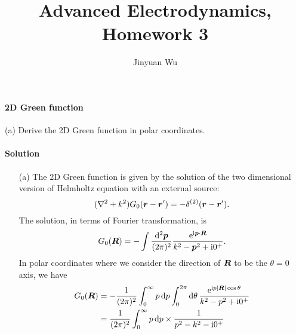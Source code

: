 \documentclass[hyperref, a4paper]{article}
\title{Advanced Electrodynamics, Homework 3}
\author{Jinyuan Wu}
\newcommand*{\ii}{\mathrm{i}}
\newcommand*{\ee}{\mathrm{e}}
\begin{document}
\maketitle

\paragraph{2D Green function} (a) Derive the 2D Green function in polar coordinates.

\paragraph{Solution} \begin{itemize}
\item[(a)] The 2D Green function is given by the solution of the two dimensional version of Helmholtz equation
with an external source: 
\begin{equation}
    (\laplacian + k^2) G_0(\vb*{r} - \vb*{r}') = - \delta^{(2)}(\vb*{r} - \vb*{r}').
\end{equation}  
The solution, in terms of Fourier transformation, is 
\[
    G_0(\vb*{R}) = - \int \frac{\dd[2]{\vb*{p}}}{(2\pi)^2} \frac{\ee^{\ii \vb*{p} \cdot \vb*{R}}}{k^2 - {\vb*{p}}^2 + \ii 0^+}.
\]
In polar coordinates where we consider the direction of $\vb*{R}$ to be the $\theta = 0$ axis, we have 
\[
    \begin{aligned}
        G_0(\vb*{R}) &= - \frac{1}{(2\pi)^2} \int_{0}^\infty p \dd{p} \int_{0}^{2\pi} \dd{\theta} 
        \frac{\ee^{\ii p \abs*{\vb*{R}} \cos \theta}}{k^2 - p^2 + \ii 0^+} \\
        &= \frac{1}{(2\pi)^2} \int_0^\infty p \dd{p} \times \frac{1}{p^2 - k^2 - \ii 0^+} 

\end{aligned}\]
\end{itemize}
\end{document}
